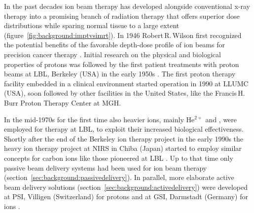 In the past decades ion beam therapy has developed alongside
conventional x-ray therapy into a promising branch of radiation
therapy that offers superior dose distributions while sparing normal
tissue to a large extent (figure~\vref{fig:background:imptvsimrt}). In
1946 Robert\,R.\,Wilson first recognized the potential benefits of the
favorable depth-dose profile of ion beams for precision cancer therapy
\citep{Wilson1946}. Initial research on the physical and biological
properties of protons was followed by the first patient treatments
with proton beams at \ac{LBL}, Berkeley (\acs*{USA}) in the early
1950s \citep{Tobias1958}. The first proton therapy facility embedded
in a clinical environment started operation in 1990 at \ac{LLUMC}
(\acs*{USA}), soon followed by other facilities in the United
States, like the Francis\,H.\,Burr Proton Therapy Center at \ac{MGH}.

In the mid-1970s for the first time also heavier ions, mainly
He$^{2+}$ and \Netw, were employed for therapy at \ac{LBL},
to exploit their increased biological effectiveness. Shortly after the
end of the Berkeley ion therapy project in the early 1990s the heavy
ion therapy project at \ac{NIRS} in Chiba (Japan) started to employ
similar concepts for carbon ions like those pioneered at \ac{LBL}
\citep{Hirao1992}. Up to that time only passive beam delivery systems
had been used for ion beam therapy
(section~\ref{sec:background:passivedelivery}). In parallel, more
elaborate active beam delivery solutions
(section~\ref{sec:background:activedelivery}) were developed at
\ac{PSI}, Villigen (Switzerland) for protons \citep{Pedroni1995} and
at \ac{GSI}, Darmstadt (Germany) for \Ctw ions \citep{Haberer1993}.

